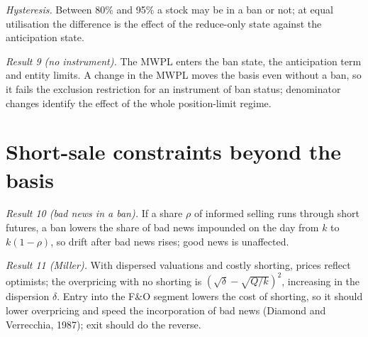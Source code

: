 \emph{Hysteresis.} Between 80\% and 95\% a stock may be in a ban or not; at equal utilisation the difference is the effect
of the reduce-only state against the anticipation state.

\emph{Result 9 (no instrument).} The MWPL enters the ban state, the anticipation term and entity limits. A change in the
MWPL moves the basis even without a ban, so it fails the exclusion restriction for an instrument of ban status;
denominator changes identify the effect of the whole position-limit regime.

\section{Short-sale constraints beyond the basis}
\emph{Result 10 (bad news in a ban).} If a share $\rho$ of informed selling runs through short futures, a ban lowers the
share of bad news impounded on the day from $k$ to $k(1-\rho)$, so drift after bad news rises; good news is unaffected.

\emph{Result 11 (Miller).} With dispersed valuations and costly shorting, prices reflect optimists; the overpricing with no
shorting is $(\sqrt{\delta}-\sqrt{Q/k})^2$, increasing in the dispersion $\delta$. Entry into the F\&O segment lowers the cost
of shorting, so it should lower overpricing and speed the incorporation of bad news (Diamond and Verrecchia, 1987); exit
should do the reverse.

